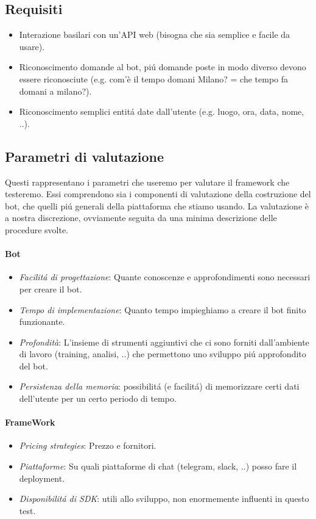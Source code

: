 \documentclass[]{article}
\begin{document}
\subsection{Requisiti}
\begin{itemize}
\item Interazione basilari con un’API web (bisogna che sia semplice e facile da usare).
\item Riconoscimento domande al bot, piú domande poste in modo diverso devono essere riconosciute (e.g. com'è il tempo domani Milano? = che tempo fa domani a milano?).
\item Riconoscimento semplici entitá date dall’utente (e.g. luogo, ora, data, nome, ..).
\end{itemize}

\subsection{Parametri di valutazione}
Questi rappresentano i parametri che useremo per valutare il framework che testeremo. Essi comprendono sia i componenti di valutazione della costruzione del bot, che quelli piú generali della piattaforma che stiamo usando. La valutazione è a nostra discrezione, ovviamente seguita da una minima descrizione delle procedure svolte.

\paragraph{Bot}
\begin{itemize}
\item \textit{Facilitá di progettazione}: Quante conoscenze e approfondimenti sono necessari per creare il bot.
\item \textit{Tempo di implementazione}: Quanto tempo impieghiamo a creare il bot finito funzionante.
\item \textit{Profondità}: L’insieme di strumenti aggiuntivi che ci sono forniti dall’ambiente di lavoro (training, analisi, ..) che permettono uno sviluppo piú approfondito del bot.
\item \textit{Persistenza della memoria}: possibilitá (e facilitá) di memorizzare certi dati dell’utente per un certo periodo di tempo.
\end{itemize}

\paragraph{FrameWork}
\begin{itemize}
\item \textit{Pricing strategies}: Prezzo e fornitori.
\item \textit{Piattaforme}: Su quali piattaforme di chat (telegram, slack, ..) posso fare il deployment.
\item \textit{Disponibilitá di SDK}: utili allo sviluppo, non enormemente influenti in questo test.
\end{itemize}
\end{document}
